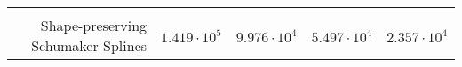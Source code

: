 \documentclass[]{article}
\begin{document}
\begin{longtable}[]{@{}rrrrr@{}}
\begin{minipage}[t]{0.15\columnwidth}
\end{minipage}\tabularnewline
\begin{minipage}[t]{0.25\columnwidth}\raggedleft
Shape-preserving Schumaker Splines\strut
\end{minipage} & \begin{minipage}[t]{0.15\columnwidth}\raggedleft
\(1.419 \cdot 10^{5}\)\strut
\end{minipage} & \begin{minipage}[t]{0.15\columnwidth}\raggedleft
\(9.976 \cdot 10^{4}\)\strut
\end{minipage} & \begin{minipage}[t]{0.15\columnwidth}\raggedleft
\(5.497 \cdot 10^{4}\)\strut
\end{minipage} & \begin{minipage}[t]{0.15\columnwidth}\raggedleft
\(2.357 \cdot 10^{4}\)\strut
\end{minipage}\tabularnewline
\bottomrule
\end{longtable}
\end{document}
